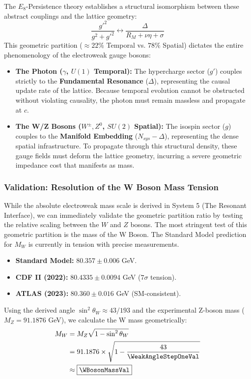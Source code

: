 The $E_8$-Persistence theory establishes a structural isomorphism between these abstract couplings and the lattice geometry:
\begin{equation}
\frac{g'^2}{g^2 + g'^2} \longleftrightarrow \frac{\Delta}{R_M + \nu\eta + \sigma}
\end{equation}
This geometric partition ($\approx 22\%$ Temporal vs. $78\%$ Spatial) dictates the entire phenomenology of the electroweak gauge bosons:
\begin{itemize}
    \item \textbf{The Photon ($\gamma$, $U(1)$ Temporal):} The hypercharge sector ($g'$) couples strictly to the \textbf{Fundamental Resonance} ($\Delta$), representing the causal update rate of the lattice. Because temporal evolution cannot be obstructed without violating causality, the photon must remain massless and propagate at $c$.
    \item \textbf{The W/Z Bosons ($W^{\pm}, Z^0$, $SU(2)$ Spatial):} The isospin sector ($g$) couples to the \textbf{Manifold Embedding} ($N_{sys} - \Delta$), representing the dense spatial infrastructure. To propagate through this structural density, these gauge fields must deform the lattice geometry, incurring a severe geometric impedance cost that manifests as mass.
\end{itemize}

\subsubsection{Validation: Resolution of the W Boson Mass Tension}
While the absolute electroweak mass scale is derived in System 5 (The Resonant Interface), we can immediately validate the geometric partition ratio by testing the relative scaling between the $W$ and $Z$ bosons. The most stringent test of this geometric partition is the mass of the W Boson. The Standard Model prediction for $M_W$ is currently in tension with precise measurements.

\begin{itemize}
    \item \textbf{Standard Model:} $80.357 \pm 0.006$ GeV.
    \item \textbf{CDF II (2022):} $80.4335 \pm 0.0094$ GeV ($7\sigma$ tension).
    \item \textbf{ATLAS (2023):} $80.360 \pm 0.016$ GeV (SM-consistent).
\end{itemize}

Using the derived angle $\sin^2 \theta_W \approx 43/193$ and the experimental Z-boson mass ($M_Z = 91.1876$ GeV), we calculate the W mass geometrically:
\begin{equation}
\begin{split}
    M_W &= M_Z \sqrt{1 - \sin^2 \theta_W} \\
    &= 91.1876 \times \sqrt{1 - \frac{43}{\WeakAngleStepOneVal}} \\
    &\approx \boxed{\mathbf{\WBosonMassVal}}
\end{split}
\end{equation}

